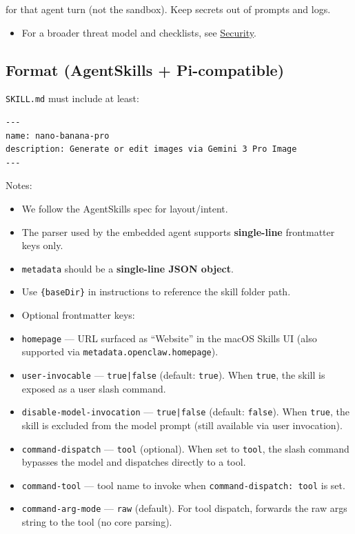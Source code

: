 for that agent turn (not the sandbox). Keep secrets out of prompts and logs.
\begin{itemize}
  \item For a broader threat model and checklists, see \href{/gateway/security}{Security}.
\end{itemize}


\subsection{Format (AgentSkills + Pi-compatible)}


\texttt{SKILL.md} must include at least:

\begin{lstlisting}
---
name: nano-banana-pro
description: Generate or edit images via Gemini 3 Pro Image
---
\end{lstlisting}


Notes:

\begin{itemize}
  \item We follow the AgentSkills spec for layout/intent.
  \item The parser used by the embedded agent supports \textbf{single-line} frontmatter keys only.
  \item \texttt{metadata} should be a \textbf{single-line JSON object}.
  \item Use \texttt{\{baseDir\}} in instructions to reference the skill folder path.
  \item Optional frontmatter keys:
  \item \texttt{homepage} — URL surfaced as “Website” in the macOS Skills UI (also supported via \texttt{metadata.openclaw.homepage}).
  \item \texttt{user-invocable} — \texttt{true|false} (default: \texttt{true}). When \texttt{true}, the skill is exposed as a user slash command.
  \item \texttt{disable-model-invocation} — \texttt{true|false} (default: \texttt{false}). When \texttt{true}, the skill is excluded from the model prompt (still available via user invocation).
  \item \texttt{command-dispatch} — \texttt{tool} (optional). When set to \texttt{tool}, the slash command bypasses the model and dispatches directly to a tool.
  \item \texttt{command-tool} — tool name to invoke when \texttt{command-dispatch: tool} is set.
  \item \texttt{command-arg-mode} — \texttt{raw} (default). For tool dispatch, forwards the raw args string to the tool (no core parsing).
\end{itemize}


